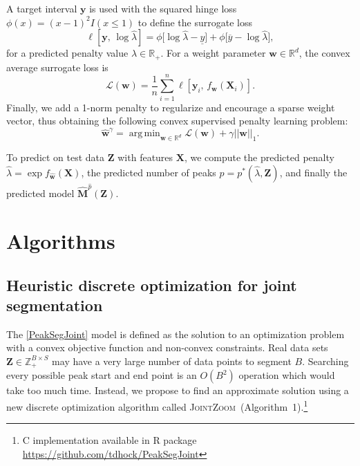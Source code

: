 \documentclass{article} %
\DeclareMathOperator*{\argmin}{arg\,min}
\newcommand{\RR}{\mathbb R}
\newcommand{\ZZ}{\mathbb Z}
\newcommand{\JointHeuristic}{\textsc{JointZoom}}
\begin{document}
A target interval $\mathbf y$ is used with the squared hinge loss
$\phi(x)=(x-1)^2 I(x\leq 1)$ to define the surrogate loss
\begin{equation}
  \label{eq:surrogate_loss}
  \ell\left[
    \mathbf y,\,
    \log \hat \lambda
    \right]
    =
    \phi\big[
      \log\hat\lambda - \underline y
    \big]
    +
    \phi\big[
    \overline y - \log\hat\lambda
    \big],
\end{equation}
for a predicted penalty value $\hat \lambda\in\RR_+$. For a weight parameter
$\mathbf w\in\RR^d$, the convex average surrogate loss is
\begin{equation}
  \label{eq:average_surrogate}
  \mathcal L(\mathbf w) =
  \frac 1 n
  \sum_{i=1}^n
  \ell\left[
    \mathbf y_i,\,
     f_{\mathbf w}( \mathbf X_i )
    \right].
\end{equation}
Finally, we add a 1-norm penalty to regularize and encourage a sparse
weight vector, thus obtaining the following convex supervised penalty
learning problem:
\begin{equation}
  \label{argmin_w}
  \mathbf{\hat w}^\gamma = 
  \argmin_{\mathbf w\in\RR^d}
  \mathcal L(\mathbf w) + \gamma ||\mathbf w||_1.
\end{equation}

To predict on test data $\mathbf Z$ with features $\mathbf
X$, we compute the predicted penalty $\hat \lambda = \exp
f_{\mathbf{\hat w}}(\mathbf X)$, the predicted number of
peaks $\hat p = p^*(\hat \lambda, \mathbf Z)$, and finally the
predicted model $\mathbf{\hat M}^{\hat p}(\mathbf Z)$.

\section{Algorithms}
\label{sec:algorithms}

\subsection{Heuristic discrete optimization for joint segmentation}

The \ref{PeakSegJoint} model is defined as the solution to an
optimization problem with a convex objective function and non-convex
constraints. 
Real data sets $\mathbf Z\in\ZZ_+^{B\times S}$ may have a very large
number of data points to segment $B$. Searching every possible peak
start and end point is an $O(B^2)$ operation which would take too much
time. 
Instead, we propose to find an approximate solution using a new
discrete optimization algorithm called
\JointHeuristic~(Algorithm~1).\footnote{C implementation available in
  R package \url{https://github.com/tdhock/PeakSegJoint}}
\end{document}

